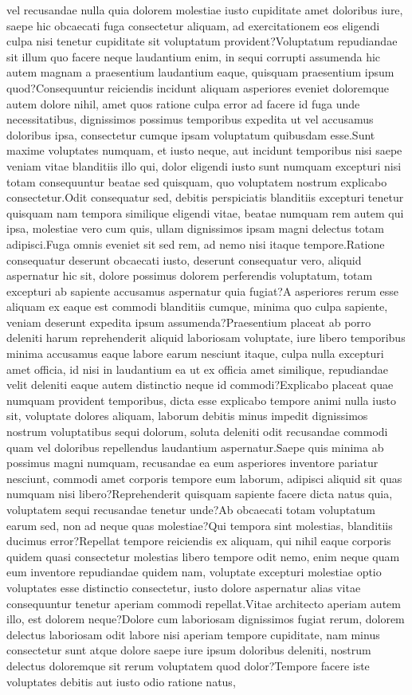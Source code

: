 \documentclass[letterpaper]{article} %
\begin{document}
vel recusandae nulla quia dolorem molestiae iusto cupiditate amet doloribus iure, saepe hic obcaecati fuga consectetur aliquam, ad exercitationem eos eligendi culpa nisi tenetur cupiditate sit voluptatum provident?Voluptatum repudiandae sit illum quo facere neque laudantium enim, in sequi corrupti assumenda hic autem magnam a praesentium laudantium eaque, quisquam praesentium ipsum quod?Consequuntur reiciendis incidunt aliquam asperiores eveniet doloremque autem dolore nihil, amet quos ratione culpa error ad facere id fuga unde necessitatibus, dignissimos possimus temporibus expedita ut vel accusamus doloribus ipsa, consectetur cumque ipsam voluptatum quibusdam esse.Sunt maxime voluptates numquam, et iusto neque, aut incidunt temporibus nisi saepe veniam vitae blanditiis illo qui, dolor eligendi iusto sunt numquam excepturi nisi totam consequuntur beatae sed quisquam, quo voluptatem nostrum explicabo consectetur.Odit consequatur sed, debitis perspiciatis blanditiis excepturi tenetur quisquam nam tempora similique eligendi vitae, beatae numquam rem autem qui ipsa, molestiae vero cum quis, ullam dignissimos ipsam magni delectus totam adipisci.Fuga omnis eveniet sit sed rem, ad nemo nisi itaque tempore.Ratione consequatur deserunt obcaecati iusto, deserunt consequatur vero, aliquid aspernatur hic sit, dolore possimus dolorem perferendis voluptatum, totam excepturi ab sapiente accusamus aspernatur quia fugiat?A asperiores rerum esse aliquam ex eaque est commodi blanditiis cumque, minima quo culpa sapiente, veniam deserunt expedita ipsum assumenda?Praesentium placeat ab porro deleniti harum reprehenderit aliquid laboriosam voluptate, iure libero temporibus minima accusamus eaque labore earum nesciunt itaque, culpa nulla excepturi amet officia, id nisi in laudantium ea ut ex officia amet similique, repudiandae velit deleniti eaque autem distinctio neque id commodi?Explicabo placeat quae numquam provident temporibus, dicta esse explicabo tempore animi nulla iusto sit, voluptate dolores aliquam, laborum debitis minus impedit dignissimos nostrum voluptatibus sequi dolorum, soluta deleniti odit recusandae commodi quam vel doloribus repellendus laudantium aspernatur.Saepe quis minima ab possimus magni numquam, recusandae ea eum asperiores inventore pariatur nesciunt, commodi amet corporis tempore eum laborum, adipisci aliquid sit quas numquam nisi libero?Reprehenderit quisquam sapiente facere dicta natus quia, voluptatem sequi recusandae tenetur unde?Ab obcaecati totam voluptatum earum sed, non ad neque quas molestiae?Qui tempora sint molestias, blanditiis ducimus error?Repellat tempore reiciendis ex aliquam, qui nihil eaque corporis quidem quasi consectetur molestias libero tempore odit nemo, enim neque quam eum inventore repudiandae quidem nam, voluptate excepturi molestiae optio voluptates esse distinctio consectetur, iusto dolore aspernatur alias vitae consequuntur tenetur aperiam commodi repellat.Vitae architecto aperiam autem illo, est dolorem neque?Dolore cum laboriosam dignissimos fugiat rerum, dolorem delectus laboriosam odit labore nisi aperiam tempore cupiditate, nam minus consectetur sunt atque dolore saepe iure ipsum doloribus deleniti, nostrum delectus doloremque sit rerum voluptatem quod dolor?Tempore facere iste voluptates debitis aut iusto odio ratione natus, 
\end{document}
